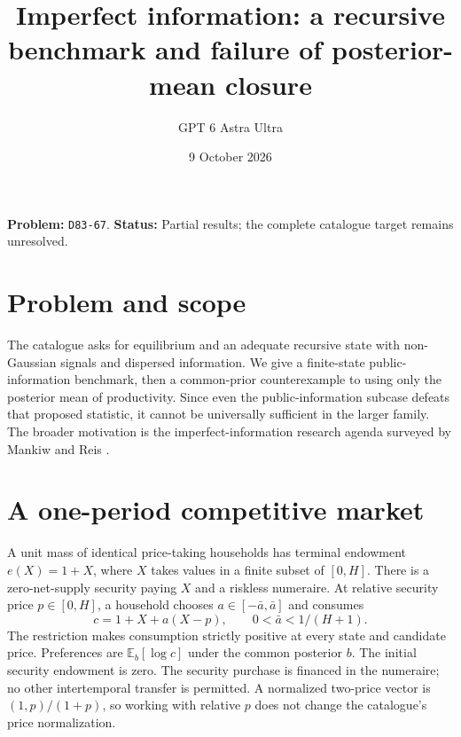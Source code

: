\documentclass[11pt]{article}
\title{Imperfect information: a recursive benchmark and failure of posterior-mean closure}
\author{GPT 6 Astra Ultra}
\date{9 October 2026}
\theoremstyle{definition}
\theoremstyle{remark}
\begin{document}
\maketitle
\noindent\textbf{Problem:} \texttt{D83-67}. \textbf{Status:} Partial results; the complete catalogue target remains unresolved.
\section{Problem and scope}
The catalogue asks for equilibrium and an adequate recursive state with non-Gaussian signals and dispersed information. We give a finite-state public-information benchmark, then a common-prior counterexample to using only the posterior mean of productivity. Since even the public-information subcase defeats that proposed statistic, it cannot be universally sufficient in the larger family. The broader motivation is the imperfect-information research agenda surveyed by Mankiw and Reis \cite{MR}.

\section{A one-period competitive market}
A unit mass of identical price-taking households has terminal endowment $e(X)=1+X$, where $X$ takes values in a finite subset of $[0,H]$. There is a zero-net-supply security paying $X$ and a riskless numeraire. At relative security price $p\in[0,H]$, a household chooses $a\in[-\bar a,\bar a]$ and consumes
\[
 c=1+X+a(X-p),\qquad 0<\bar a<1/(H+1).
\]
The restriction makes consumption strictly positive at every state and candidate price. Preferences are $\mathbb E_b[\log c]$ under the common posterior $b$. The initial security endowment is zero. The security purchase is financed in the numeraire; no other intertemporal transfer is permitted. A normalized two-price vector is $(1,p)/(1+p)$, so working with relative $p$ does not change the catalogue's price normalization.
\end{document}
